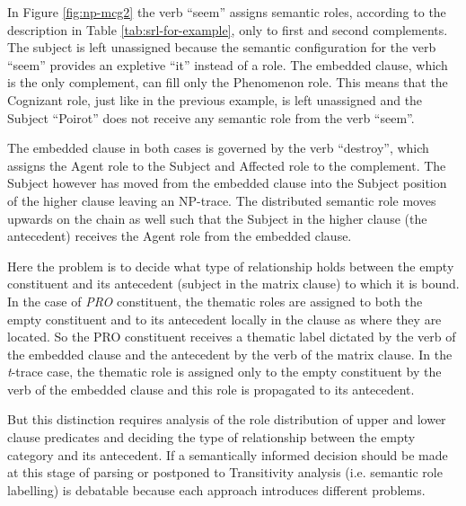     In Figure \ref{fig:np-mcg2} the verb ``seem'' assigns semantic roles, according to the description in Table \ref{tab:srl-for-example}, only to first and second complements. The subject is left unassigned because the semantic configuration for the verb ``seem'' provides an expletive ``it'' instead of a role. The embedded clause, which is the only complement, can fill only the Phenomenon role. This means that the Cognizant role, just like in the previous example, is left unassigned and the Subject ``Poirot'' does not receive any semantic role from the verb ``seem''. 

    The embedded clause in both cases is governed by the verb ``destroy'', which assigns the Agent role to the Subject and Affected role to the complement. The Subject however has moved from the embedded clause into the Subject position of the higher clause leaving an NP-trace. The distributed semantic role moves upwards on the chain as well such that the Subject in the higher clause (the antecedent) receives the Agent role from the embedded clause. 

    Here the problem is to decide what type of relationship holds between the empty constituent and its antecedent (subject in the matrix clause) to which it is bound. In the case of \textit{PRO} constituent, the thematic roles are assigned to both the empty constituent and to its antecedent locally in the clause as where they are located. So the PRO constituent receives a thematic label dictated by the verb of the embedded clause and the antecedent by the verb of the matrix clause. In the \textit{t}-trace case, the thematic role is assigned only to the empty constituent by the verb of the embedded clause and this role is propagated to its antecedent. 

    But this distinction requires analysis of the role distribution of upper and lower clause predicates and deciding the type of relationship between the empty category and its antecedent. 
    If a semantically informed decision should be made at this stage of parsing or postponed to Transitivity analysis (i.e. semantic role labelling) is debatable because each approach introduces different problems. 

